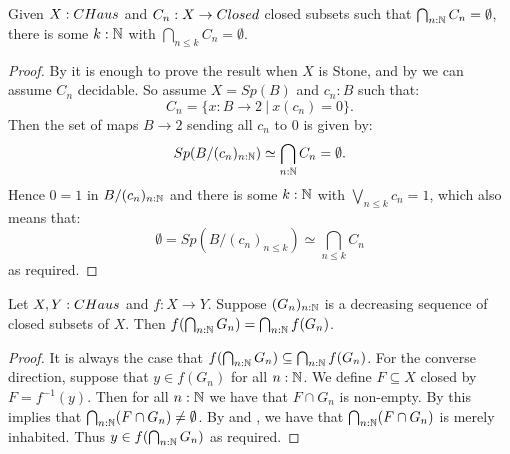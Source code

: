 \begin{lemma}\label{CHausFiniteIntersectionProperty}
  Given $X:\Chaus$ and $C_n:X\to \Closed$ closed subsets such that $\bigcap_{n:\mathbb{N}} C_n =\emptyset$, there is some $k:\mathbb{N}$ 
  with $\bigcap_{n\leq k} C_n  = \emptyset$. 
\end{lemma}
\begin{proof}
  By  it is enough to prove the result when $X$ is Stone, and by  we can assume $C_n$ decidable.
  So assume 
  $X=Sp(B)$ and $c_n:B$ such that: 
  $$C_n = \{x:B\to 2\ |\ x(c_n) = 0\}.$$ 
  Then the set of maps $B\to 2$ sending all $c_n$ to $0$ is given by: 
  $$Sp(B/(c_n)_{n:\N})%
  \simeq \bigcap_{n:\N} C_n = \emptyset .$$
  Hence 
  $0=1$ in $B/(c_n)_{n:\mathbb{N}}$ %
  and there is some $k:\mathbb{N}$ with 
  $\bigvee_{n\leq k} c_n = 1$, which also means that: 
  $$\emptyset = Sp(B/(c_n)_{n\leq k}) %
  \simeq \bigcap_{n\leq k} C_n $$
  as required.
\end{proof}

\begin{corollary}\label{ChausMapsPreserveIntersectionOfClosed}
  Let $X,Y:\CHaus$ and $f:X \to Y$. 
  Suppose $(G_n)_{n:\mathbb{N}}$ is a decreasing sequence of closed subsets of $X$. 
  Then $f(\bigcap_{n:\mathbb{N}} G_n) = \bigcap_{n:\mathbb{N}}f(G_n)$. 
\end{corollary}
\begin{proof}
  It is always the case that $f(\bigcap_{n:\mathbb{N}} G_n) \subseteq \bigcap_{n:\mathbb{N}} f(G_n)$. 
  For the converse direction, suppose that $y \in f(G_n)$ for all $n:\mathbb{N}$. 
  We define $F\subseteq X$ closed by $F=f^{-1}(y)$. 
  Then for all $n:\mathbb{N}$ we have that $F\cap G_n$ is %
  non-empty. 
  By  this implies that $\bigcap_{n:\mathbb{N}}(F\cap G_n) \neq \emptyset$. 
  By  and , 
  we have that $\bigcap_{n:\mathbb{N}} (F\cap G_n)$ is merely inhabited. Thus $y\in f(\bigcap_{n:\mathbb{N}} G_n)$ as required. 
\end{proof}


